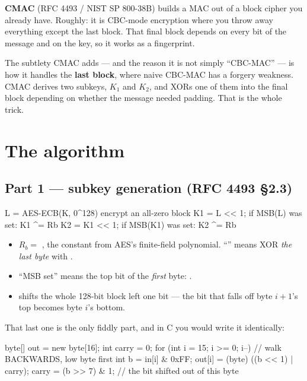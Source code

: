 \textbf{CMAC} (RFC 4493 / NIST SP 800-38B) builds a MAC out of a block cipher
you already have. Roughly: it is CBC-mode encryption where you throw away
everything except the last block. That final block depends on every bit of the
message and on the key, so it works as a fingerprint.

The subtlety CMAC adds --- and the reason it is not simply ``CBC-MAC'' --- is how
it handles the \textbf{last block}, where naive CBC-MAC has a forgery weakness.
CMAC derives two subkeys, $K_1$ and $K_2$, and XORs one of them into the final
block depending on whether the message needed padding. That is the whole trick.

\section{The algorithm}

\subsection{Part 1 --- subkey generation (RFC 4493 §2.3)}

\begin{trace}
L  = AES-ECB(K, 0^128)                 encrypt an all-zero block
K1 = L << 1;   if MSB(L)  was set:  K1 ^= Rb
K2 = K1 << 1;  if MSB(K1) was set:  K2 ^= Rb
\end{trace}

\begin{itemize}
  \item $R_b = $ , the constant from AES's finite-field polynomial.
        ``'' means XOR \emph{the last byte} with .
  \item ``MSB set'' means the top bit of the \emph{first} byte:
        .
  \item {} shifts the whole 128-bit block left one bit --- the bit that
        falls off byte $i{+}1$'s top becomes byte $i$'s bottom.
\end{itemize}

That last one is the only fiddly part, and in C you would write it identically:

\begin{jcode}
byte[] out = new byte[16];
int carry = 0;
for (int i = 15; i >= 0; i--) {      // walk BACKWARDS, low byte first
    int b = in[i] & 0xFF;
    out[i] = (byte) ((b << 1) | carry);
    carry = (b >> 7) & 1;            // the bit shifted out of this byte
}
\end{jcode}

